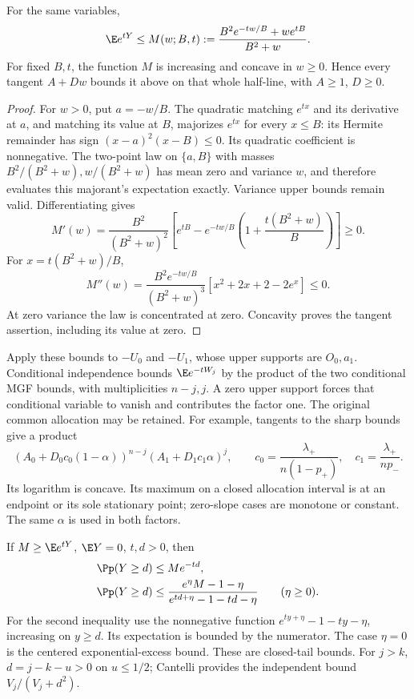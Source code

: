 \begin{lemma}
\label{ms:finite:countcore:sharpmgf}
For the same variables,
\[
 \E e^{tY}\le M(w;B,t):=
 \frac{B^2e^{-tw/B}+we^{tB}}{B^2+w}.
\]
For fixed \(B,t\), the function \(M\) is increasing and concave in
\(w\ge0\). Hence every tangent \(A+D w\) bounds it above on that
whole half-line, with \(A\ge1\), \(D\ge0\).
\end{lemma}
\begin{proof}
For \(w>0\), put \(a=-w/B\). The quadratic matching \(e^{tx}\)
and its derivative at \(a\), and matching its value at \(B\),
majorizes \(e^{tx}\) for every \(x\le B\): its Hermite remainder
has sign \((x-a)^2(x-B)\le0\). Its quadratic coefficient is
nonnegative. The two-point law on \(\{a,B\}\) with masses
\(B^2/(B^2+w),w/(B^2+w)\) has mean zero and variance \(w\),
and therefore evaluates this majorant's expectation exactly. Variance
upper bounds remain valid. Differentiating gives
\[
 M'(w)=\frac{B^2}{(B^2+w)^2}
 \left[e^{tB}-e^{-tw/B}\left(1+\frac{t(B^2+w)}B\right)\right]\ge0.
\]
For \(x=t(B^2+w)/B\),
\[
 M''(w)=\frac{B^2e^{-tw/B}}{(B^2+w)^3}
        [x^2+2x+2-2e^x]\le0.
\]
At zero variance the law is concentrated at zero. Concavity proves the
tangent assertion, including its value at zero.
\end{proof}

Apply these bounds to \(-U_0\) and \(-U_1\), whose upper supports
are \(O_0,a_1\). Conditional independence bounds
\(\E e^{-tW_j}\) by the product of the two conditional MGF bounds,
with multiplicities \(n-j,j\). A zero upper support forces that
conditional variable to vanish and contributes the factor one.
The original common allocation may be retained. For example, tangents
to the sharp bounds give a product
\[
 (A_0+D_0c_0(1-\alpha))^{n-j}
 (A_1+D_1c_1\alpha)^j,
 \qquad c_0=\frac{\lambda_+}{n(1-p_+)},\quad
 c_1=\frac{\lambda_+}{np_-}.
\]
Its logarithm is concave. Its maximum on a closed allocation interval
is at an endpoint or its sole stationary point; zero-slope cases are
monotone or constant. The same \(\alpha\) is used in both factors.

If \(M\ge\E e^{tY}\), \(\E Y=0\), \(t,d>0\), then
\begin{align}
 \Pp(Y\ge d)&\le Me^{-td},\notag\\
 \Pp(Y\ge d)&\le
 \frac{e^\eta M-1-\eta}{e^{td+\eta}-1-td-\eta}
 \qquad(\eta\ge0).
 \label{ms:finite:countcore:shiftedexcess}
\end{align}
For the second inequality use the nonnegative function
\(e^{ty+\eta}-1-ty-\eta\), increasing on \(y\ge d\).
Its expectation is bounded by the numerator. The case \(\eta=0\)
is the centered exponential-excess bound. These are closed-tail bounds.
For \(j>k\), \(d=j-k-u>0\) on \(u\le1/2\); Cantelli provides
the independent bound \(V_j/(V_j+d^2)\).

